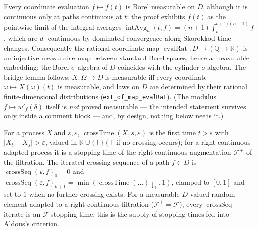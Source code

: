\begin{theorem}[Evaluations are Borel; Borel $=$ cylinder]\label{thm:sk-eval}
  \leanok
  Every coordinate evaluation $f\mapsto f(t)$ is Borel measurable on $D$, although it is
  continuous only at paths continuous at $t$: the proof exhibits $f(t)$ as the pointwise
  limit of the integral averages $\operatorname{intAvg}_n(t,f)=(n{+}1)\int_t^{t+1/(n+1)}f$,
  which are $d^\circ$-continuous by dominated convergence along Skorokhod time changes.
  Consequently the rational-coordinate map $\operatorname{evalRat}\colon D\to(\mathbb{Q}\to\mathbb{R})$
  is an injective measurable map between standard Borel spaces, hence a measurable
  embedding: the Borel $\sigma$-algebra of $D$ coincides with the cylinder
  $\sigma$-algebra.  The bridge lemma follows: $X\colon\Omega\to D$ is measurable iff every
  coordinate $\omega\mapsto X(\omega)(t)$ is measurable, and laws on $D$ are determined by
  their rational finite-dimensional distributions (\texttt{ext\_of\_map\_evalRat}).
  (The modulus $f\mapsto w'_f(\delta)$ itself is \emph{not} proved measurable --- the
  intended statement survives only inside a comment block --- and, by design, nothing
  below needs it.)
\end{theorem}

\begin{theorem}\label{thm:sk-crossseq}
  \leanok
  For a process $X$ and $s,\varepsilon$, $\operatorname{crossTime}(X,s,\varepsilon)$ is the
  first time $t>s$ with $|X_t-X_s|>\varepsilon$, valued in $\mathbb{R}\cup\{\top\}$ ($\top$
  if no crossing occurs); for a right-continuous adapted process it is a stopping time of
  the right-continuous augmentation $\mathcal{F}^+$ of the filtration.  The iterated
  crossing sequence of a path $f\in D$ is $\operatorname{crossSeq}(\varepsilon,f)_0=0$ and
  $\operatorname{crossSeq}(\varepsilon,f)_{k+1}=\min(\operatorname{crossTime}(\dots)\!\downharpoonright_1,1)$,
  clamped to $[0,1]$ and set to $1$ when no further crossing exists.  For a measurable
  $D$-valued random element adapted to a right-continuous filtration
  ($\mathcal{F}^+=\mathcal{F}$), every $\operatorname{crossSeq}$ iterate is an
  $\mathcal{F}$-stopping time; this is the supply of stopping times fed into Aldous's
  criterion.
\end{theorem}

